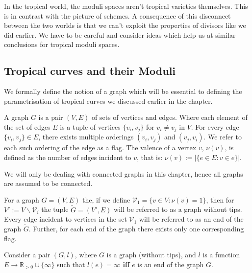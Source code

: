 \par In the tropical world, the moduli spaces aren't tropical varieties themselves. 
This is in contrast with the picture of schemes.
A consequence of this disconnect between the two worlds is that we can't exploit the properties of divisors like we did earlier.
We have to be careful and consider ideas which help us at similar conclusions for tropical moduli spaces.

\subsection{Tropical curves and their Moduli}

We formally define the notion of a graph which will be essential to defining the parametrisation of tropical curves we discussed earlier in the chapter.

\begin{definition}[Graphs]
    A graph $G$ is a pair $(V,E)$ of sets of vertices and edges.
    Where each element of the set of edges $E$ is a tuple of vertices $\{v_{i},v_{j}\}$ for $v_{i} \neq v_{j}$ in $V$. 
    For every edge $\{v_{i},v_{j}\} \in E$, there exists multiple orderings $(v_{i},v_{j})$ and $(v_{j},v_{i})$. We refer to each such ordering of the edge as a flag.
    The valence of a vertex $v$, $\nu(v)$, is defined as the number of edges incident to $v$, that is: $\nu(v):=|\{e \in E: v\in e\}|$.
\end{definition}

\begin{remark}
    We will only be dealing with connected graphs in this chapter, hence all graphs are assumed to be connected.
\end{remark}

\begin{definition}
    For a graph $G = (V,E)$ the, if we define $\mathcal{V}_{1} = \{v \in V: \nu(v) =1  \}$, then for $V':= V\backslash \mathcal{V}_{i}$ the tuple $\tilde{G} = (V',E)$ will be referred to as a graph without tips. 
    Every edge incident to vertices in the set $\mathcal{V}_{1}$ will be referred to as an end of the graph $\tilde G$.
    Further, for each end of the graph there exists only one corresponding flag.
\end{definition}


\begin{definition}
    Consider a pair $(G,l)$, where $G$ is a graph (without tips), and $l$ is a function $E \to \mathbb{R}_{>0} \cup \{\infty\}$ such that $l(e) = \infty$ \textbf{iff} $e$ is an end of the graph $G$.
\end{definition}

